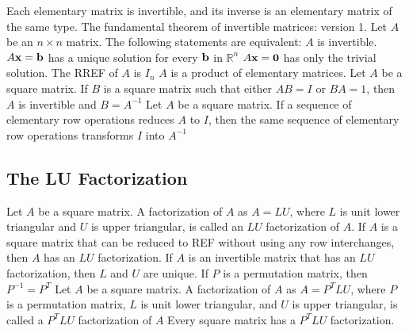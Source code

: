 \documentclass{article}
\begin{document}
\begin{outline}
            \1 Each elementary matrix is invertible, and its inverse is an elementary matrix of the same type. 
            \1 The fundamental theorem of invertible matrices: version 1. Let $A$ be an \(n\times n\) matrix. The following statements are equivalent: 
                \2 \(A\) is invertible. 
                \2 \(A\vb x=\vb b\) has a unique solution for every \(\vb b\) in \(\mathbb R^n\)
                \2 \(A\vb x=\vb 0\) has only the trivial solution. 
                \2 The RREF of \(A\) is \(I_n\)
                \2 \(A\) is a product of elementary matrices. 
            \1 Let \(A\) be a square matrix. If \(B\) is a square matrix such that either \(AB=I\) or \(BA=1\), then \(A\) is invertible and \(B=A^{-1}\)
            \1 Let \(A\) be a square matrix. If a sequence of elementary row operations reduces \(A\) to \(I\), then the same sequence of elementary row operations transforms \(I\) into \(A^{-1}\)

       \end{outline}
       \subsection{The LU Factorization}
       \begin{outline}
            \1 Let \(A\) be a square matrix. A factorization of \(A\) as \(A=LU\), where \(L\) is unit lower triangular and \(U\) is upper triangular, is called an \(LU\) factorization of \(A\). 
            \1 If \(A\) is a square matrix that can be reduced to REF without using any row interchanges, then \(A\) has an \(LU\) factorization. 
            \1 If \(A\) is an invertible matrix that has an \(LU\) factorization, then \(L\) and \(U\) are unique. 
            \1 If \(P\) is a permutation matrix, then \(P^{-1}=P^T\)
            \1 Let \(A\) be a square matrix. A factorization of \(A\) as \(A=P^TLU\), where \(P\) is a permutation matrix, $L$ is unit lower triangular, and $U$ is upper triangular, is called a \(P^TLU\) factorization of \(A\)
            \1 Every square matrix has a \(P^TLU\) factorization. 
       \end{outline}
\end{document}
